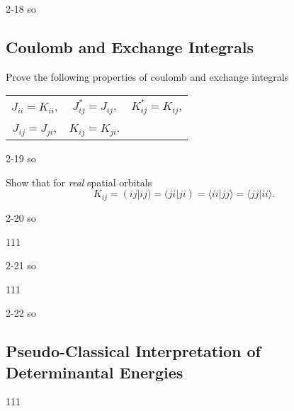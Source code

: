 \documentclass[a4paper]{book}
\begin{document}
	\begin{solution}
		2-18 so
	\end{solution}
	
	\subsection{Coulomb and Exchange Integrals}

	\begin{exercise}
	Prove the following properties of coulomb and exchange integrals
	\begin{center}
	\begin{tabular}{ccc}
		$J_{ii} = K_{ii}$, & $J^*_{ij} = J_{ij}$, &  $K^*_{ij} = K_{ij}$, \\
		$J_{ij} = J_{ji}$, & $K_{ij} = K_{ji}$.
	\end{tabular}
	\end{center}
	\end{exercise}
	
	\begin{solution}
		2-19 so
	\end{solution}
	
	\begin{exercise}
	Show that for {\it real} spatial orbitals
	\[
		K_{ij} = (ij|ij) = (ji|ji) = \langle ii | jj \rangle = \langle jj | ii \rangle.
	\]
	\end{exercise}
	
	\begin{solution}
		2-20 so
	\end{solution}
	
	\begin{exercise}
	111
	\end{exercise}
	
	\begin{solution}
		2-21 so
	\end{solution}
	
	\begin{exercise}
	111
	\end{exercise}
	
	\begin{solution}
		2-22 so
	\end{solution}
	
	\subsection{Pseudo-Classical Interpretation of Determinantal Energies}
	
	\begin{exercise}
	111
	\end{exercise}
	
\end{document}
